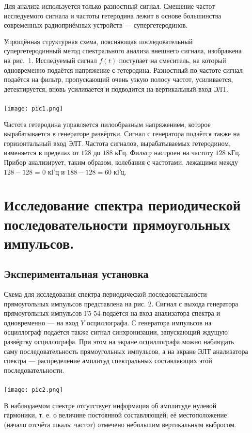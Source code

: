 Для анализа используется только разностный сигнал. Смешение частот
исследуемого сигнала и частоты гетеродина лежит в основе большинства
современных радиоприёмных устройств — супергетеродинов.

Упрощённая структурная схема, поясняющая последовательный супергетеродинный метод спектрального анализа внешнего сигнала, изображена на рис.~1. Исследуемый сигнал $f(t)$ поступает на смеситель, на
который одновременно подаётся напряжение с гетеродина. Разностный
по частоте сигнал подаётся на фильтр, пропускающий очень узкую полосу частот, усиливается, детектируется, вновь усиливается и подводится
на вертикальный вход ЭЛТ.\\
\\
\texttt{[image: pic1.png]}

Частота гетеродина управляется пилообразным напряжением, которое вырабатывается в генераторе развёртки. Сигнал с генератора подаётся также на горизонтальный вход ЭЛТ. Частота сигналов, вырабатываемых гетеродином, изменяется в пределах от $128$ до $188$ кГц. Фильтр
настроен на частоту $128$ кГц. Прибор анализирует, таким образом, колебания с частотами, лежащими между $128 - 128$ = $0$ кГц и $188 - 128 = 60$ кГц.

\section{\label{sec:level1}Исследование спектра периодической последовательности прямоугольных импульсов.}

\subsection{\label{sec:level2}Экспериментальная установка}

Схема для исследования спектра периодической последовательности прямоугольных импульсов представлена на рис. 2. Сигнал с выхода генератора прямоугольных импульсов Г5-54
подаётся на вход анализатора спектра и одновременно — на вход $Y$ осциллографа. С генератора импульсов на осциллограф подаётся также сигнал синхронизации, запускающий ждущую развёртку осциллографа. При
этом на экране осциллографа можно наблюдать саму последовательность
прямоугольных импульсов, а на экране ЭЛТ анализатора спектра — распределение амплитуд спектральных составляющих этой последовательности.\\
\\
\texttt{[image: pic2.png]}

В наблюдаемом спектре отсутствует информация об амплитуде нулевой гармоники, т. е. о величине постоянной составляющей; её местоположение (начало отсчёта шкалы частот) отмечено небольшим вертикальным выбросом.

